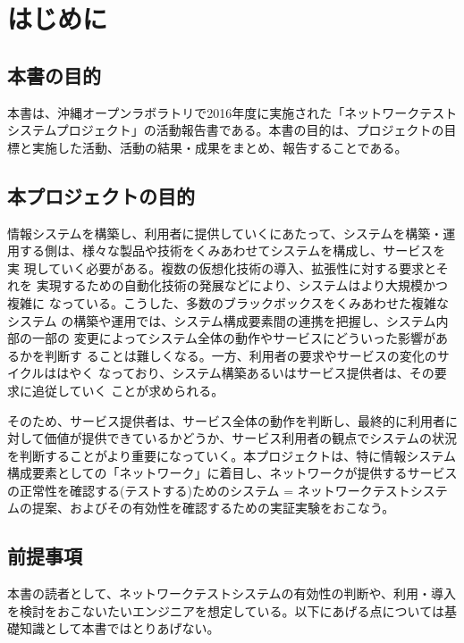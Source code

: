 
\chapter{はじめに}

 \section{本書の目的}

本書は、沖縄オープンラボラトリで2016年度に実施された「ネットワークテスト
システムプロジェクト」の活動報告書である。本書の目的は、プロジェクトの目
標と実施した活動、活動の結果・成果をまとめ、報告することである。

 \section{本プロジェクトの目的}

情報システムを構築し、利用者に提供していくにあたって、システムを構築・運
用する側は、様々な製品や技術をくみあわせてシステムを構成し、サービスを実
現していく必要がある。複数の仮想化技術の導入、拡張性に対する要求とそれを
実現するための自動化技術の発展などにより、システムはより大規模かつ複雑に
なっている。こうした、多数のブラックボックスをくみあわせた複雑なシステム
の構築や運用では、システム構成要素間の連携を把握し、システム内部の一部の
変更によってシステム全体の動作やサービスにどういった影響があるかを判断す
ることは難しくなる。一方、利用者の要求やサービスの変化のサイクルははやく
なっており、システム構築あるいはサービス提供者は、その要求に追従していく
ことが求められる。

そのため、サービス提供者は、サービス全体の動作を判断し、最終的に利用者に
対して価値が提供できているかどうか、サービス利用者の観点でシステムの状況
を判断することがより重要になっていく。本プロジェクトは、特に情報システム
構成要素としての「ネットワーク」に着目し、ネットワークが提供するサービス
の正常性を確認する(テストする)ためのシステム = ネットワークテストシステ
ムの提案、およびその有効性を確認するための実証実験をおこなう。

\section{前提事項}

本書の読者として、ネットワークテストシステムの有効性の判断や、利用・導入
を検討をおこないたいエンジニアを想定している。以下にあげる点については基
礎知識として本書ではとりあげない。

